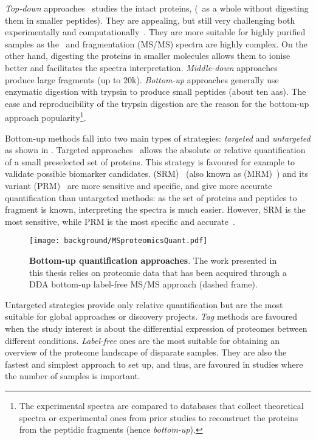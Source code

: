 \emph{Top-down} approaches~ studies the intact proteins,
(\ie\ as a whole without digesting them in smaller peptides).
They are appealing, but still very challenging both
experimentally and computationally~.
They are more suitable for highly purified samples
as the \ms\ and fragmentation (\gls{MS/MS}) spectra are highly complex.
On the other hand,
digesting the proteins in smaller molecules allows them
to ionise better and facilitates the spectra interpretation.
\emph{Middle-down} approaches~ produce
large fragments (up to 20k).
\emph{Bottom-up} approaches generally use enzymatic digestion with trypsin
to produce small peptides (about ten \glspl{aa}).
The ease and reproducibility of the trypsin digestion
are the reason for the bottom-up approach popularity\footnote{%
The experimental spectra are compared to databases
that collect theoretical spectra or experimental ones from prior studies
to reconstruct the proteins from the peptidic fragments (hence \emph{bottom-up}).%
}.

Bottom-up methods fall into two main types of strategies:
\emph{targeted} and \emph{untargeted} as shown in .
Targeted approaches~ allows
the absolute or relative quantification of a small preselected set of proteins.
This strategy is favoured for example to validate possible biomarker candidates.
 (\gls{SRM})~
(also known as  (\gls{MRM})~)
and its variant  (\gls{PRM})~
are more sensitive and specific, and give more accurate quantification
than untargeted methods:
as the set of proteins and peptides to fragment is known,
interpreting the spectra is much easier.
However, \gls{SRM} is the most sensitive,
while \gls{PRM} is the most specific and accurate~.

\begin{figure}[!htbp]
    \texttt{[image: background/MSproteomicsQuant.pdf]}\centering
    \caption[Bottom-up quantification approaches]{\label{fig:msbottomupQuant}%
    \textbf{Bottom-up quantification approaches}.
    The work presented in this thesis relies on proteomic data
    that has been acquired through a \gls{DDA} bottom-up label-free
    \gls{MS/MS} approach (dashed frame).
    }
\end{figure}

Untargeted strategies provide only relative quantification
but are the most suitable for global approaches or discovery projects.
\emph{Tag} methods are favoured
when the study interest is about the differential expression of proteomes between
different conditions.
\emph{Label-free} ones are the most suitable for obtaining an overview of
the proteome landscape of disparate samples.
They are also the fastest and simplest approach to set up,
and thus, are favoured in studies where the number of samples is important.

